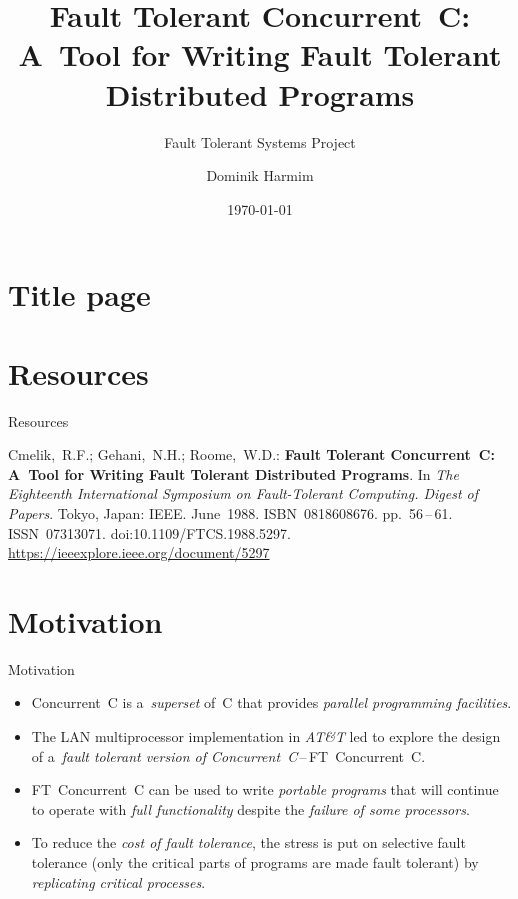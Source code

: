 \documentclass[
    10pt, hyperref={unicode, colorlinks, hypertexnames=false,
    linkcolor=white}, aspectratio=169
]{beamer}
\title{
    Fault Tolerant Concurrent~C: A~Tool for Writing Fault Tolerant
    Distributed Programs
}
\subtitle{Fault Tolerant Systems Project}
\author{Dominik Harmim}
\institute{%
    xharmi00@stud.fit.vutbr.cz \\
    Brno University of Technology, Faculty of Information Technology
}
\date{\today}
\begin{document}
\section{Title page}
\frame[plain]{\titlepage}


\section{Resources}
\begin{frame}{Resources}
    \vfill
    \begin{thebibliography}{3}
            Cmelik,~R.F.; Gehani,~N.H.; Roome,~W.D.: \textbf{Fault Tolerant
            Concurrent~C: A~Tool for Writing Fault Tolerant Distributed
            Programs}. In \textit{The Eighteenth International Symposium on
            Fault-Tolerant Computing. Digest of Papers}. Tokyo, Japan: IEEE.
            June~1988. ISBN~0818608676. pp.~56\,--\,61. ISSN~07313071.
            doi:10.1109/FTCS.1988.5297.
        \newblock \url{https://ieeexplore.ieee.org/document/5297}
    \end{thebibliography}
    \vfill
\end{frame}


\section{Motivation}
\begin{frame}{Motivation}
    \begin{itemize}\setlength\itemsep{2.5em}
        \item
            \alert{Concurrent~C} is a~\emph{superset} of~C that provides
            \emph{parallel programming facilities}.

        \item
            The LAN multiprocessor implementation in \emph{AT\&T} led to
            explore the design of a~\emph{fault tolerant version of
            Concurrent~C}\,--\,\alert{FT~Concurrent~C}.

        \item
            \alert{FT~Concurrent~C} can be used to write \emph{portable
            programs} that will continue to operate with \emph{full
            functionality} despite the \emph{failure of some processors}.

        \item
            To reduce the \emph{cost of fault tolerance}, the stress is
            put on \alert{selective fault tolerance} (only the critical
            parts of programs are made fault tolerant) by \emph{replicating
            critical processes}.
    \end{itemize}
\end{frame}
\end{document}
